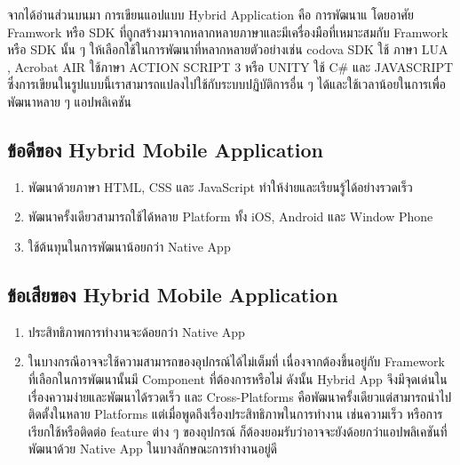 จากได้อ่านส่วนบนมา การเขียนแอปแบบ Hybrid Application คือ การพัฒนาแ โดยอาศัย Framwork หรือ SDK 
ที่ถูกสร้างมาจากหลากหลายภาษาและมีเครื่องมือที่เหมาะสมกับ Framwork หรือ SDK นั้น ๆ ให้เลือกใช้ในการพัฒนาที่หลากหลายตัวอย่างเช่น 
codova SDK ใช้ ภาษา LUA , Acrobat AIR ใช้ภาษา ACTION SCRIPT 3 หรือ UNITY ใช้ C# และ JAVASCRIPT 
ซึ่งการเขียนในรูปแบบนี้เราสามารถแปลงไปใช้กับระบบปฏิบัติการอื่น ๆ ได้และใช้เวลาน้อยในการเพื่อพัฒนาหลาย ๆ แอปพลิเคชัน

	\subsection{ข้อดีของ Hybrid Mobile Application}
	\begin{enumerate}
		\item พัฒนาด้วยภาษา HTML, CSS และ JavaScript ทำให้ง่ายและเรียนรู้ได้อย่างรวดเร็ว
		\item พัฒนาครั้งเดียวสามารถใช้ได้หลาย Platform ทั้ง iOS, Android และ Window Phone
		\item ใช้ต้นทุนในการพัฒนาน้อยกว่า Native App
	\end{enumerate}

	\subsection{ข้อเสียของ Hybrid Mobile Application}
	\begin{enumerate}
		\item ประสิทธิภาพการทำงานจะด้อยกว่า Native App
		\item ในบางกรณีอาจจะใช้ความสามารถของอุปกรณ์ได้ไม่เต็มที่ เนื่องจากต้องขึ้นอยู่กับ Framework ที่เลือกในการพัฒนานั้นมี Component ที่ต้องการหรือไม่
		ดังนั้น Hybrid App จึงมีจุดเด่นในเรื่องความง่ายและพัฒนาได้รวดเร็ว และ Cross-Platforms คือพัฒนาครั้งเดียวแต่สามารถนำไปติดตั้งในหลาย Platforms แต่เมื่อพูดถึงเรื่องประสิทธิภาพในการทำงาน เช่นความเร็ว หรือการเรียกใช้หรือติดต่อ feature ต่าง ๆ ของอุปกรณ์ ก็ต้องยอมรับว่าอาจจะยังด้อยกว่าแอปพลิเคชันที่พัฒนาด้วย Native App ในบางลักษณะการทำงานอยู่ดี
	\end{enumerate}

